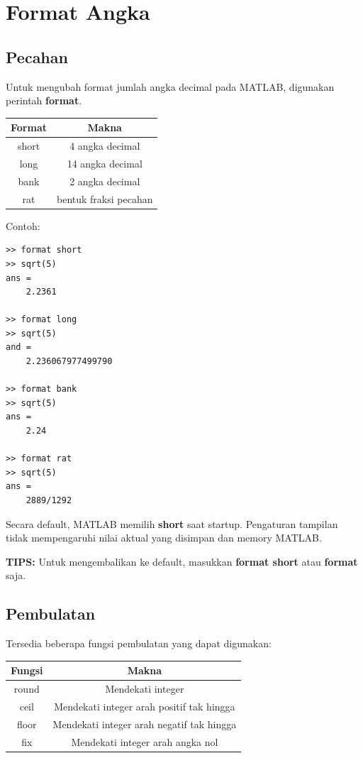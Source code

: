 \documentclass[12pt]{book}
\begin{document}
	\section{Format Angka}
	\subsection{Pecahan}
	
	Untuk mengubah format jumlah angka decimal pada MATLAB, digunakan perintah \textbf{format}.
	
	\begin{center}
		\begin{tabular}{|c|c|}
			\hline
			Format & Makna \\
			\hline\hline
			short & 4 angka decimal \\
			\hline
			long & 14 angka decimal \\
			\hline
			bank & 2 angka decimal \\
			\hline
			rat & bentuk fraksi pecahan \\
			\hline
		\end{tabular}
	\end{center}
	
	Contoh:
	\begin{verbatim}
>> format short
>> sqrt(5)
ans =
    2.2361

>> format long
>> sqrt(5)
and =
    2.236067977499790
    
>> format bank
>> sqrt(5)
ans =
    2.24
    
>> format rat
>> sqrt(5)
ans =
    2889/1292
	\end{verbatim}
    
    Secara default, MATLAB memilih \textbf{short} saat startup.
    Pengaturan tampilan tidak mempengaruhi nilai aktual yang disimpan dan memory MATLAB.
    
    \textbf{TIPS:} Untuk mengembalikan ke default, masukkan \textbf{format short} atau \textbf{format} saja.
    
    \subsection{Pembulatan}
    
    Tersedia beberapa fungsi pembulatan yang dapat digunakan:
    
    \begin{center}
    	\begin{tabular}{|c|c|}
    		\hline
    		Fungsi & Makna \\
    		\hline\hline
    		round & Mendekati integer\\
    		\hline
    		ceil & Mendekati integer arah positif tak hingga \\
    		\hline
    		floor & Mendekati integer arah negatif tak hingga \\
    		\hline
    		fix & Mendekati integer arah angka nol \\
    		\hline
    	\end{tabular}
    \end{center}
\end{document}

